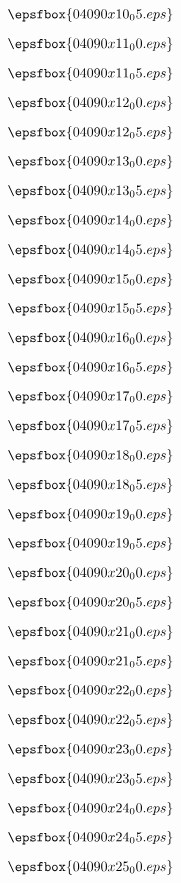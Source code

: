 \vfil \eject
$$\epsfbox{04090x10_05.eps}$$

\vfil \eject
$$\epsfbox{04090x11_00.eps}$$

\vfil \eject
$$\epsfbox{04090x11_05.eps}$$

\vfil \eject
$$\epsfbox{04090x12_00.eps}$$

\vfil \eject
$$\epsfbox{04090x12_05.eps}$$

\vfil \eject
$$\epsfbox{04090x13_00.eps}$$

\vfil \eject
$$\epsfbox{04090x13_05.eps}$$

\vfil \eject
$$\epsfbox{04090x14_00.eps}$$

\vfil \eject
$$\epsfbox{04090x14_05.eps}$$

\vfil \eject
$$\epsfbox{04090x15_00.eps}$$

\vfil \eject
$$\epsfbox{04090x15_05.eps}$$

\vfil \eject
$$\epsfbox{04090x16_00.eps}$$

\vfil \eject
$$\epsfbox{04090x16_05.eps}$$

\vfil \eject
$$\epsfbox{04090x17_00.eps}$$

\vfil \eject
$$\epsfbox{04090x17_05.eps}$$

\vfil \eject
$$\epsfbox{04090x18_00.eps}$$

\vfil \eject
$$\epsfbox{04090x18_05.eps}$$

\vfil \eject
$$\epsfbox{04090x19_00.eps}$$

\vfil \eject
$$\epsfbox{04090x19_05.eps}$$

\vfil \eject
$$\epsfbox{04090x20_00.eps}$$

\vfil \eject
$$\epsfbox{04090x20_05.eps}$$

\vfil \eject
$$\epsfbox{04090x21_00.eps}$$

\vfil \eject
$$\epsfbox{04090x21_05.eps}$$

\vfil \eject
$$\epsfbox{04090x22_00.eps}$$

\vfil \eject
$$\epsfbox{04090x22_05.eps}$$

\vfil \eject
$$\epsfbox{04090x23_00.eps}$$ %

\vfil \eject
$$\epsfbox{04090x23_05.eps}$$


\vfil \eject
$$\epsfbox{04090x24_00.eps}$$ 

\vfil \eject
$$\epsfbox{04090x24_05.eps}$$ 

\vfil \eject
$$\epsfbox{04090x25_00.eps}$$ 

